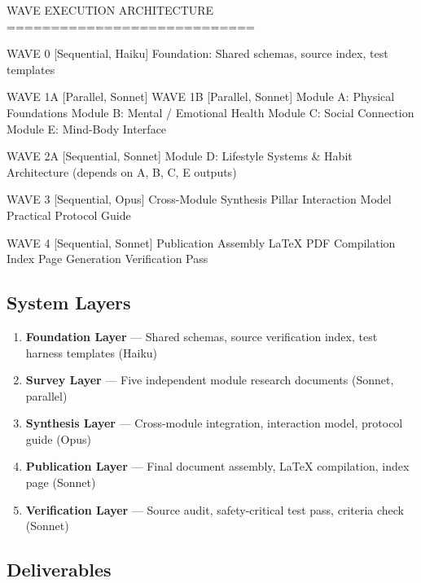 \documentclass[11pt,letterpaper]{article}
\begin{document}
\begin{asciibox}
WAVE EXECUTION ARCHITECTURE
============================

WAVE 0 [Sequential, Haiku]
  Foundation: Shared schemas, source index, test templates

WAVE 1A [Parallel, Sonnet]          WAVE 1B [Parallel, Sonnet]
  Module A: Physical Foundations      Module B: Mental / Emotional Health
  Module C: Social Connection         Module E: Mind-Body Interface

WAVE 2A [Sequential, Sonnet]
  Module D: Lifestyle Systems & Habit Architecture
  (depends on A, B, C, E outputs)

WAVE 3 [Sequential, Opus]
  Cross-Module Synthesis
  Pillar Interaction Model
  Practical Protocol Guide

WAVE 4 [Sequential, Sonnet]
  Publication Assembly
  LaTeX PDF Compilation
  Index Page Generation
  Verification Pass
\end{asciibox}

\subsection{System Layers}

\begin{enumerate}[leftmargin=1.5em]
  \item \textbf{Foundation Layer} --- Shared schemas, source verification index, test harness templates (Haiku)
  \item \textbf{Survey Layer} --- Five independent module research documents (Sonnet, parallel)
  \item \textbf{Synthesis Layer} --- Cross-module integration, interaction model, protocol guide (Opus)
  \item \textbf{Publication Layer} --- Final document assembly, LaTeX compilation, index page (Sonnet)
  \item \textbf{Verification Layer} --- Source audit, safety-critical test pass, criteria check (Sonnet)
\end{enumerate}

\subsection{Deliverables}
\end{document}
